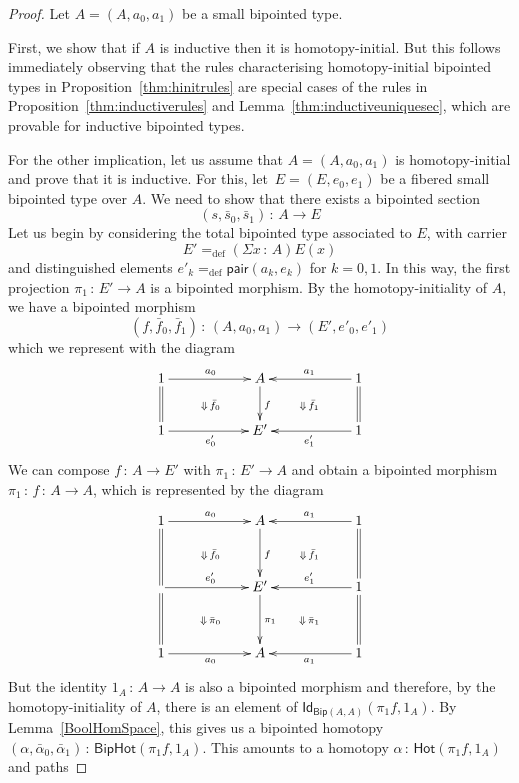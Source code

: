 \documentclass[10pt,a4paper,oneside,reqno]{amsart}
\numberwithin{equation}{section}
\theoremstyle{mythm}
\theoremstyle{mydef}
\theoremstyle{myrmk}
\newcommand{\defeq}{=_{\mathrm{def}}}
\newcommand{\co}{\,{:}\,}
\newcommand{\Hot}{\mathsf{Hot}}
\newcommand{\Id}{\mathsf{Id}}
\newcommand{\pair}{\mathsf{pair}}
\newcommand{\Bip}{\mathsf{Bip}}
\newcommand{\BipHot}{\mathsf{BipHot}}
\begin{document}
\begin{proof} Let $A = (A, a_0, a_1)$ be a small bipointed type. 

First, we show that if $A$ is inductive then
it is homotopy-initial. But this follows immediately observing that the rules characterising homotopy-initial bipointed types in Proposition~\ref{thm:hinitrules}
are special cases of the rules in Proposition~\ref{thm:inductiverules} and Lemma~\ref{thm:inductiveuniquesec},
which are provable for inductive bipointed types. 

For the other implication, 
let us assume that $A = (A, a_0, a_1)$ is homotopy-initial and prove that it is inductive. 
For this, let~$E = (E, e_0, e_1)$ be a fibered small bipointed type over $A$. We need to show that there
exists a bipointed section
\begin{equation}
\label{equ:reqsec}
(s, \bar{s}_0, \bar{s}_1) \co A \to E
\end{equation}
Let us begin by considering the total bipointed type associated to $E$, with carrier 
\[
E' \defeq (\Sigma x \co A) E(x) 
\]
and distinguished elements $e'_k \defeq \pair(a_k, e_k)$ for $k = 0, 1$. In this way,  the first projection $\pi_1 \co 
E' \to A$ is a bipointed morphism. By the homotopy-initiality of $A$, we have a bipointed morphism 
\[
(f, \bar{f}_0, \bar{f}_1) \co (A, a_0, a_1)  \to (E', e'_0, e'_1) 
\]
which we represent with the diagram
\[
\xymatrix@C=2cm{
1 \ar[r]^{a_0} \ar@{=}[d] \ar@{}[dr]|{\Downarrow \, \bar{f}_0} & A  \ar[d]^f & 1 \ar[l]_{a_1} \ar@{=}[d]
 \ar@{}[dl]|{\Downarrow \, \bar{f}_1}   \\
1 \ar[r]_{e'_0}  & E' & 1 \ar[l]^{e'_1} }
 \]
 We can compose $f \co A \to E'$ with $\pi_1 \co E' \to A$ and obtain a bipointed morphism $\pi_1 \co f \co A \to A$, which is represented by the diagram
  \[
\xymatrix@C=2cm@R=1.2cm{
1  \ar[r]^{a_0} \ar@{=}[d]  \ar@{}[dr]|{\Downarrow \, \bar{f}_0}  & A  \ar[d]^f & 1 \ar[l]_{a_1}  \ar@{=}[d]  
 \ar@{}[dl]|{\Downarrow \, \bar{f}_1} \\
\ar[r]^{e'_0} \ar@{=}[d]   \ar@{}[dr]|{\Downarrow \, \bar{\pi}_0}  & E' \ar[d]^{\pi_1}  & 1 \ar[l]_{e'_1} \ar@{=}[d] 
 \ar@{}[dl]|{\Downarrow \, \bar{\pi}_1}  \\
1 \ar[r]_{a_0} & A &  1 \ar[l]^{a_1}}
 \]
But the identity $1_A \co A \to A$ is also a bipointed morphism and therefore, by the homotopy-initiality of $A$, there is an element of $\Id_{\Bip(A,A)}(\pi_1  f, 1_A)$. 
 By Lemma~\ref{BoolHomSpace}, this gives us a bipointed homotopy $(\alpha,
\bar{\alpha}_0,\bar{\alpha}_1) \co \BipHot( \pi_1 f , 1_A)$. This amounts to a homotopy $\alpha \co \Hot(\pi_1  f, 1_A)$ and paths

\end{proof}
\end{document}
